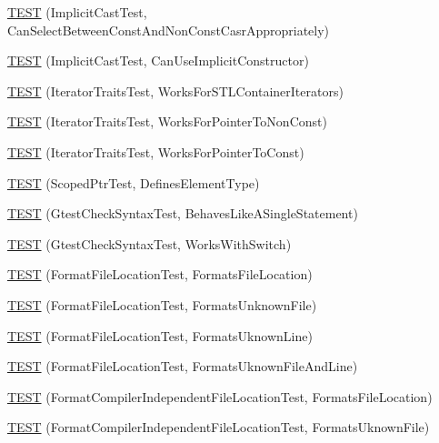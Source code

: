 \begin{DoxyCompactItemize}
\item 
\hyperlink{namespacetesting_1_1internal_a62a3b62658f9d47733cb7b5c8f69b2ad}{T\+E\+ST} (Implicit\+Cast\+Test, Can\+Select\+Between\+Const\+And\+Non\+Const\+Casr\+Appropriately)
\item 
\hyperlink{namespacetesting_1_1internal_ad5c2cf37cc5aa78744012255cae78f9b}{T\+E\+ST} (Implicit\+Cast\+Test, Can\+Use\+Implicit\+Constructor)
\item 
\hyperlink{namespacetesting_1_1internal_abd56ca990c5b8c1aea44d15028a74f33}{T\+E\+ST} (Iterator\+Traits\+Test, Works\+For\+S\+T\+L\+Container\+Iterators)
\item 
\hyperlink{namespacetesting_1_1internal_a642234d85836450bb8795cf0a8a9f908}{T\+E\+ST} (Iterator\+Traits\+Test, Works\+For\+Pointer\+To\+Non\+Const)
\item 
\hyperlink{namespacetesting_1_1internal_afc0e95a0472d243967fd4720c681c478}{T\+E\+ST} (Iterator\+Traits\+Test, Works\+For\+Pointer\+To\+Const)
\item 
\hyperlink{namespacetesting_1_1internal_a99f56e2e9d5b30a879f877cc72bb0c0c}{T\+E\+ST} (Scoped\+Ptr\+Test, Defines\+Element\+Type)
\item 
\hyperlink{namespacetesting_1_1internal_a26d00130a017a66d0d60dc5a02a13d25}{T\+E\+ST} (Gtest\+Check\+Syntax\+Test, Behaves\+Like\+A\+Single\+Statement)
\item 
\hyperlink{namespacetesting_1_1internal_a4dfd147ff396984fca799878cb53dcea}{T\+E\+ST} (Gtest\+Check\+Syntax\+Test, Works\+With\+Switch)
\item 
\hyperlink{namespacetesting_1_1internal_a1a1c20d78e9e75b9c7f2b767eb62611b}{T\+E\+ST} (Format\+File\+Location\+Test, Formats\+File\+Location)
\item 
\hyperlink{namespacetesting_1_1internal_ace2f5407afdfb0767035d44b6758e4a0}{T\+E\+ST} (Format\+File\+Location\+Test, Formats\+Unknown\+File)
\item 
\hyperlink{namespacetesting_1_1internal_a17d1f472b6c1154de7b5b008b964ee32}{T\+E\+ST} (Format\+File\+Location\+Test, Formats\+Uknown\+Line)
\item 
\hyperlink{namespacetesting_1_1internal_a1195aaf7258c5442de7aebd95acefb9f}{T\+E\+ST} (Format\+File\+Location\+Test, Formats\+Uknown\+File\+And\+Line)
\item 
\hyperlink{namespacetesting_1_1internal_a9c12f8c1ebb19906e8fa0c430d139076}{T\+E\+ST} (Format\+Compiler\+Independent\+File\+Location\+Test, Formats\+File\+Location)
\item 
\hyperlink{namespacetesting_1_1internal_a65ad1cad17717c1b8ac4c2d4bef5e079}{T\+E\+ST} (Format\+Compiler\+Independent\+File\+Location\+Test, Formats\+Uknown\+File)

\end{DoxyCompactItemize}
